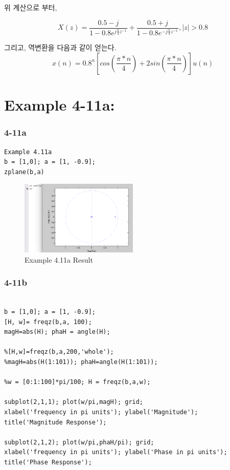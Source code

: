\documentclass[11pt
  , a4paper
  , article
  , oneside
]{memoir}
\begin{document}
위 계산으로 부터,
 
\begin {equation}
X(z) =\frac{0.5-j}{1-0.8e^{j\frac{\pi}{4}z^{-1}}}+\frac{0.5+j}{1-0.8e^{-j\frac{\pi}{4}z^{-1}}}, |z| > 0.8
\end {equation}

그리고, 역변환을 다음과 같이 얻는다.
\begin {equation}
x(n) = 0.8^n[cos(\frac{\pi*n}{4})+2sin(\frac{\pi*n}{4})]u(n)
\end {equation}


\chapter{Example 4-11a:}
\subsection{4-11a}
\begin{lstlisting}[style=termstyle]
Example 4.11a
b = [1,0]; a = [1, -0.9];
zplane(b,a)\end{lstlisting}

\begin{figure}[h!]
	\centering
	\includegraphics[width=0.5\textwidth,height=0.3\textwidth]{./images/ex411-a.png}
	\caption{Example 4.11a Result}
	\label{fig:Example 4.11a Result}
\end{figure}

\subsection{4-11b}
\begin{lstlisting}[style=termstyle]
%Example 4.11-b

b = [1,0]; a = [1, -0.9];
[H, w]= freqz(b,a, 100);
magH=abs(H); phaH = angle(H);

%[H,w]=freqz(b,a,200,'whole');
%magH=abs(H(1:101)); phaH=angle(H(1:101));

%w = [0:1:100]*pi/100; H = freqz(b,a,w);

subplot(2,1,1); plot(w/pi,magH); grid;
xlabel('frequency in pi units'); ylabel('Magnitude');
title('Magnitude Response');

subplot(2,1,2); plot(w/pi,phaH/pi); grid;
xlabel('frequency in pi units'); ylabel('Phase in pi units');
title('Phase Response');
\end{lstlisting}
\end{document}
